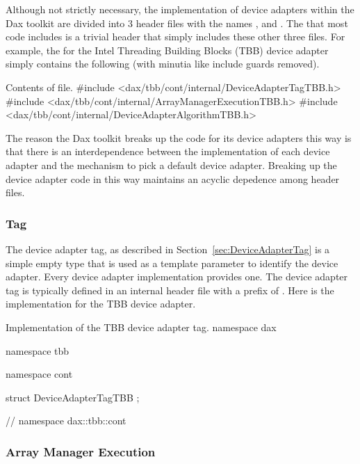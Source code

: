 Although not strictly necessary, the implementation of device adapters
within the Dax toolkit are divided into 3 header files with the names
,
 and
. The
 that most code includes
is a trivial header that simply includes these other three files. For
example, the  for the Intel
Threading Building Blocks (TBB) device adapter simply contains the
following (with minutia like include guards removed).

\begin{daxexample}{Contents of \protect{} file.}
#include <dax/tbb/cont/internal/DeviceAdapterTagTBB.h>
#include <dax/tbb/cont/internal/ArrayManagerExecutionTBB.h>
#include <dax/tbb/cont/internal/DeviceAdapterAlgorithmTBB.h>
\end{daxexample}

The reason the Dax toolkit breaks up the code for its device adapters this
way is that there is an interdependence between the implementation of each
device adapter and the mechanism to pick a default device adapter. Breaking
up the device adapter code in this way maintains an acyclic depedence among
header files.

\subsubsection{Tag}

The device adapter tag, as described in Section~\ref{sec:DeviceAdapterTag}
is a simple empty type that is used as a template parameter to identify the
device adapter. Every device adapter implementation provides one. The
device adapter tag is typically defined in an internal header file with a
prefix of . Here is the implementation for
the TBB device adapter.

\begin{daxexample}{Implementation of the TBB device adapter tag.}
namespace dax {
namespace tbb {
namespace cont {

struct DeviceAdapterTagTBB {  };

}
}
} // namespace dax::tbb::cont
\end{daxexample}

\subsubsection{Array Manager Execution}

